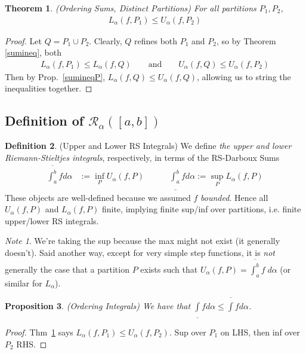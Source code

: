 \documentclass[12pt]{book}
\numberwithin{equation}{section} %
\theoremstyle{plain}
\newtheorem{thm}{Theorem}[section]
\newtheorem{prop}[thm]{Proposition}
\theoremstyle{definition}
\newtheorem{defn}[thm]{Definition}
\theoremstyle{remark}
\newtheorem*{note}{Note}
\begin{document}
\begin{thm}\emph{(Ordering Sums, Distinct Partitions)}
\label{pineq}
For all partitions $P_1, P_2$,
\begin{align*}
  L_\alpha(f,P_1) \leq U_\alpha(f,P_2)
\end{align*}
\end{thm}
\begin{proof}
Let $Q = P_1 \cup P_2$.  Clearly, $Q$ refines both $P_1$ and $P_2$, so
by Theorem \ref{sumineq}, both
\begin{align*}
  L_\alpha(f,P_1) \leq L_\alpha(f,Q)
  \qquad\text{and}\qquad
  U_\alpha(f,Q) \leq U_\alpha(f,P_2)
\end{align*}
Then by Prop.~\ref{sumineqP},
$L_\alpha(f,Q) \leq U_\alpha(f,Q)$, allowing us to string the
inequalities together.
\end{proof}


\subsection{Definition of $\mathscr{R}_\alpha([a,b])$}


\begin{defn}(Upper and Lower RS Integrals)
We define \emph{the upper and lower Riemann-Stieltjes integrals},
respectively, in terms of the RS-Darboux Sums
\begin{align*}
    \overline{\int^b_a} f d\alpha &:= \inf_P U_\alpha(f,P)
    \qquad\quad
    \underline{\int^b_a} f d\alpha := \sup_P L_\alpha(f,P)
\end{align*}
These objects are well-defined because we assumed $f$ \emph{bounded}.
Hence all $U_\alpha(f,P)$ and $L_\alpha(f,P)$ finite, implying finite
sup/inf over partitions, i.e. finite upper/lower RS integrals.
\end{defn}

\begin{note}
We're taking the sup because the max might not exist (it generally
doesn't). Said another way, except for very simple step functions, it is
\emph{not} generally the case that a partition $P$ exists such that
$U_\alpha(f,P)=\overline{\int^b_a} f\; d\alpha$ (or similar for
$L_\alpha$).
\end{note}

\begin{prop}\emph{(Ordering Integrals)}
\label{intineq}
We have that
$\underline{\int} f d\alpha \leq \overline{\int} f d\alpha$.
\end{prop}
\begin{proof}
Thm~\ref{pineq} says
$L_\alpha(f,P_1) \leq U_\alpha(f,P_2)$.
Sup over $P_1$ on LHS, then inf over $P_2$ RHS.
\end{proof}
\end{document}
